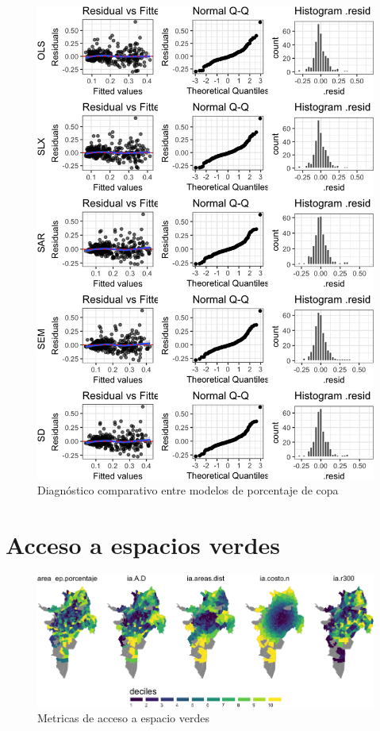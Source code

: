\documentclass[12pt,]{book}
\begin{document}
\begin{figure}
\includegraphics[width=1\linewidth]{tesis-unigis_files/figure-latex/diag-model-espaciales-copaap-1} \caption{Diagnóstico comparativo entre modelos de porcentaje de copa}\label{fig:diag-model-espaciales-copaap}
\end{figure}

\section{Acceso a espacios verdes}\label{acceso-a-espacios-verdes-1}

\begin{figure}
\includegraphics[width=1\linewidth]{tesis-unigis_files/figure-latex/mapa-dependienteEV-all-1} \caption{Metricas de acceso a espacio verdes}\label{fig:mapa-dependienteEV-all}
\end{figure}
\end{document}
